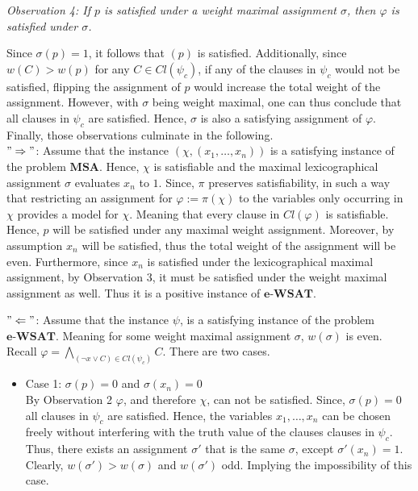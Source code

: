 \documentclass[11pt,a4paper]{article}
\begin{document}
\begin{enumerate}
\begin{enumerate}
\emph{Observation 4: If $p$ is satisfied under a weight maximal assignment $\sigma$, then $\varphi$ is satisfied under $\sigma$.}

Since $\sigma(p)=1$, it follows that $(p)$ is satisfied. Additionally, since $w(C)>w(p)$ for any $C \in \mathit{Cl}(\psi_c)$, if any of the clauses in $\psi_c$ would not be satisfied, flipping the assignment of $p$ would increase the total weight of the assignment. However, with $\sigma$ being weight maximal, one can thus conclude that all clauses in $\psi_c$ are satisfied. Hence, $\sigma$ is also a satisfying assignment of $\varphi$. \\ 


Finally, those observations culminate in the following. \\

$"\Rightarrow"$: Assume that the instance $(\chi, (x_1, \dots , x_n))$ is a satisfying instance of the problem $\textbf{MSA}$. Hence, $\chi$ is satisfiable and the maximal lexicographical assignment $\sigma$ evaluates $x_n$ to $1$. Since, $\pi$ preserves satisfiability, in such a way that restricting an assignment for $\varphi:=\pi(\chi)$ to the variables only occurring in $\chi$ provides a model for $\chi$.  Meaning that every clause in $\mathit{Cl}(\varphi)$ is satisfiable. Hence, $p$ will be satisfied under any maximal weight assignment. Moreover, by assumption $x_n$ will be satisfied, thus the total weight of the assignment will be even. Furthermore, since $x_n$ is satisfied under the lexicographical maximal assignment, by Observation 3,  it must be satisfied under the weight maximal assignment as well. Thus it is a positive instance of $\textbf{e-WSAT}$.  


$"\Leftarrow"$: Assume that the instance $\psi$,  is a satisfying instance of the problem $\textbf{e-WSAT}$.  Meaning for some weight maximal assignment $\sigma$, $w(\sigma)$ is even. Recall $\varphi = \bigwedge_{(\neg x \lor C) \in \mathit{Cl}(\psi_c)} C$. There are two cases. 
\begin{itemize}
\item Case 1: $\sigma(p)=0$ and $\sigma(x_n)=0$\\
By Observation 2 $\varphi$, and therefore $\chi$, can not be satisfied. Since, $\sigma(p)=0$ all clauses in $\psi_c$ are satisfied. Hence, the variables $x_1, \dots , x_n$ can be chosen freely without interfering with the truth value of the clauses clauses in $\psi_c$. Thus, there exists an assignment $\sigma'$ that is the same $\sigma$, except $\sigma'(x_n)=1$. Clearly, $w(\sigma')>w(\sigma)$ and $w(\sigma')$ odd. Implying the impossibility of this case.



\end{itemize}
\end{enumerate}
\end{enumerate}
\end{document}
